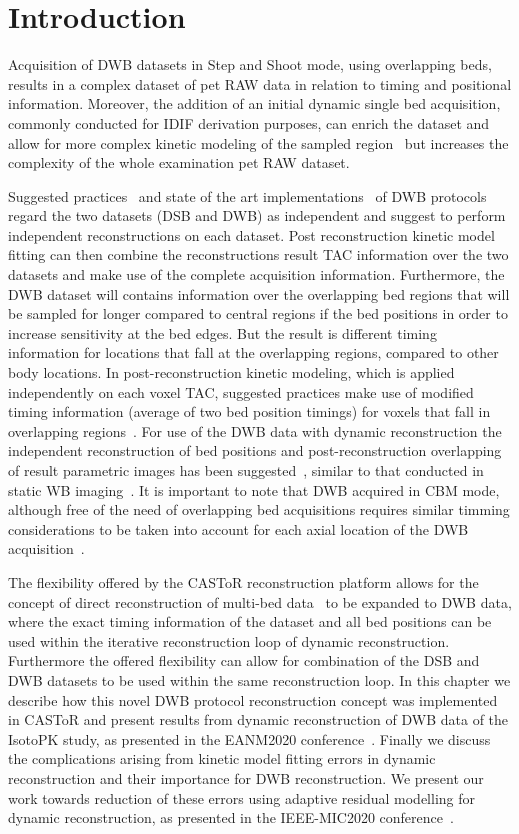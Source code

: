 \section{Introduction}
Acquisition of DWB datasets in Step and Shoot mode, using overlapping beds, results in a complex dataset of pet RAW data in relation to timing and positional information. Moreover, the addition of an initial dynamic single bed acquisition, commonly conducted for IDIF derivation purposes, can enrich the dataset and allow for more complex kinetic modeling of the sampled region~\cite{Zaker2020} but increases the complexity of the whole examination pet RAW dataset. 

Suggested practices~\cite{Karakatsanis2013} and state of the art implementations~\cite{Hu2020} of DWB protocols regard the two datasets (DSB and DWB) as independent and suggest to perform independent reconstructions on each dataset. Post reconstruction kinetic model fitting can then combine the reconstructions result TAC information over the two datasets and make use of the complete acquisition information. 
Furthermore, the DWB dataset will contains information over the overlapping bed regions that will be sampled for longer compared to central regions if the bed positions in order to increase sensitivity at the bed edges. But the result is different timing information for locations that fall at the overlapping regions, compared to other body locations. In post-reconstruction kinetic modeling, which is applied independently on each voxel TAC, suggested practices make use of modified timing information (average of two bed position timings) for voxels that fall in overlapping regions~\cite{Karakatsanis2013}. 
For use of the DWB data with dynamic reconstruction the independent reconstruction of bed positions and post-reconstruction overlapping of result parametric images has been suggested~\cite{Karakatsanis2016a}, similar to that conducted in static WB imaging~\cite{Schubert1996}.
It is important to note that DWB acquired in CBM mode, although free of the need of overlapping bed acquisitions requires similar timming considerations to be taken into account for each axial location of the DWB acquisition~\cite{Karakatsanis2016b,Hu2020}.

The flexibility offered by the CASToR reconstruction platform allows for the concept of direct reconstruction of multi-bed data~\cite{Ross2004} to be expanded to DWB data, where the exact timing information of the dataset and all bed positions can be used within the iterative reconstruction loop of dynamic reconstruction. Furthermore the offered flexibility can allow for combination of the DSB and DWB datasets to be used within the same reconstruction loop. 
In this chapter we describe how this novel DWB protocol reconstruction concept was implemented in CASToR and present results from dynamic reconstruction of DWB data of the IsotoPK study, as presented in the EANM2020 conference~\cite{chalampalakis2020EANM}.
Finally we discuss the complications arising from kinetic model fitting errors in dynamic reconstruction and their importance for DWB reconstruction. We present our work towards reduction of these errors using adaptive residual modelling for dynamic reconstruction, as presented in the IEEE-MIC2020 conference~\cite{}.

